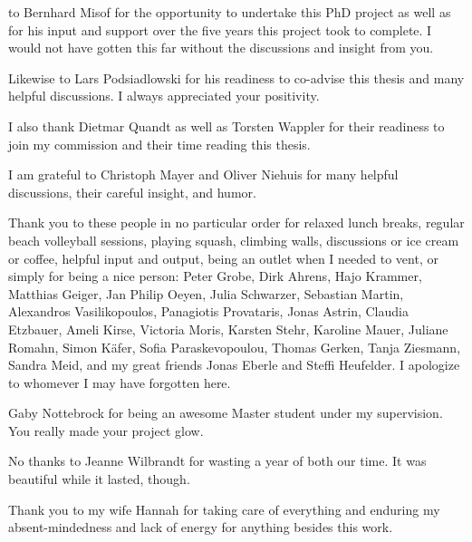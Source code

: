 
 to Bernhard Misof for the opportunity to
undertake this PhD project as well as for his input and support over the
five years this project took to complete. I would not have gotten this
far without the discussions and insight from you.

Likewise to Lars Podsiadlowski for his readiness to co-advise this
thesis and many helpful discussions. I always appreciated your
positivity.

I also thank Dietmar Quandt as well as Torsten Wappler for their
readiness to join my commission and their time reading this thesis.

I am grateful to Christoph Mayer and Oliver Niehuis for many helpful
discussions, their careful insight, and humor.

Thank you to these people in no particular order for relaxed lunch
breaks, regular beach volleyball sessions, playing squash, climbing
walls, discussions or ice cream or coffee, helpful input and output,
being an outlet when I needed to vent, or simply for being a nice
person:
Peter Grobe, Dirk Ahrens, Hajo Krammer, Matthias Geiger, Jan Philip
Oeyen, Julia Schwarzer, Sebastian Martin, Alexandros Vasilikopoulos,
Panagiotis Provataris, Jonas Astrin, Claudia Etzbauer, Ameli Kirse,
Victoria Moris, Karsten Stehr, Karoline Mauer, Juliane
Romahn, Simon K\"afer, Sofia Paraskevopoulou, Thomas Gerken, Tanja
Ziesmann, Sandra Meid, and my great friends Jonas Eberle and Steffi
Heufelder. I apologize to whomever I may have forgotten here.

Gaby Nottebrock for being an awesome Master student under my supervision.
You really made your project glow.

No thanks to Jeanne Wilbrandt for wasting a year of both our time. It
was beautiful while it lasted, though.

Thank you to my wife Hannah for taking care of everything and enduring
my absent-mindedness and lack of energy for anything besides this
work. 
